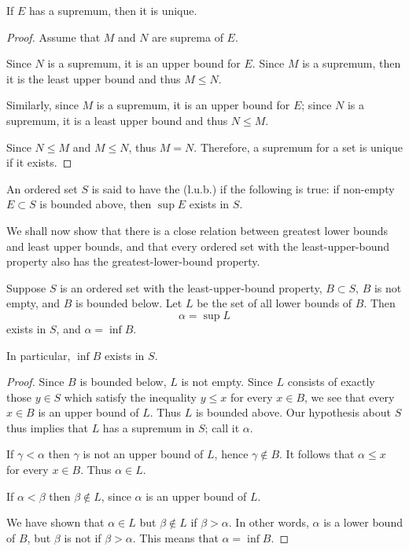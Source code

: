 \begin{proposition}
If $E$ has a supremum, then it is unique.
\end{proposition}

\begin{proof}
Assume that $M$ and $N$ are suprema of $E$.

Since $N$ is a supremum, it is an upper bound for $E$. Since $M$ is a supremum, then it is the least upper bound and thus $M \le N$. 

Similarly, since $M$ is a supremum, it is an upper bound for $E$; since $N$ is a supremum, it is a least upper bound and thus $N \le M$.

Since $N \le M$ and $M \le N$, thus $M=N$. Therefore, a supremum for a set is unique if it exists.
\end{proof}

\begin{definition}
An ordered set $S$ is said to have the  (l.u.b.) if the following is true: if non-empty $E\subset S$ is bounded above, then $\sup E$ exists in $S$.
\end{definition}

We shall now show that there is a close relation between greatest lower bounds and least upper bounds, and that every ordered set with the least-upper-bound property also has the greatest-lower-bound property.

\begin{theorem}
Suppose $S$ is an ordered set with the least-upper-bound property, $B\subset S$, $B$ is not empty, and $B$ is bounded below. Let $L$ be the set of all lower bounds of $B$. Then
\[ \alpha=\sup L \]
exists in $S$, and $\alpha=\inf B$.

In particular, $\inf B$ exists in $S$.
\end{theorem}

\begin{proof}
Since $B$ is bounded below, $L$ is not empty. Since $L$ consists of exactly those $y\in S$ which satisfy the inequality $y\le x$ for every $x\in B$, we see that every $x\in B$ is an upper bound of $L$. Thus $L$ is bounded above. Our hypothesis about $S$ thus implies that $L$ has a supremum in $S$; call it $\alpha$.

If $\gamma<\alpha$ then $\gamma$ is not an upper bound of $L$, hence $\gamma\notin B$. It follows that $\alpha\le x$ for every $x\in B$. Thus $\alpha\in L$.

If $\alpha<\beta$ then $\beta\notin L$, since $\alpha$ is an upper bound of $L$.

We have shown that $\alpha\in L$ but $\beta\notin L$ if $\beta>\alpha$. In other words, $\alpha$ is a lower bound of $B$, but $\beta$ is not if $\beta>\alpha$. This means that $\alpha=\inf B$.
\end{proof}


